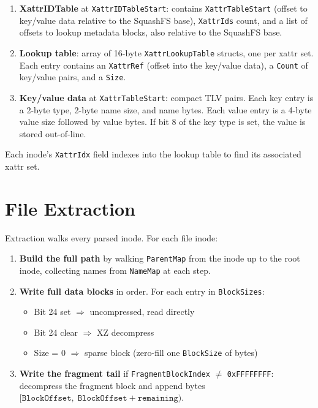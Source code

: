 \documentclass[11pt,a4paper]{article}
\begin{document}
\begin{enumerate}
    \item \textbf{XattrIDTable} at \texttt{XattrIDTableStart}: contains
      \texttt{XattrTableStart} (offset to key/value data relative to the
      SquashFS base), \texttt{XattrIds} count, and a list of offsets to
      lookup metadata blocks, also relative to the SquashFS base.

    \item \textbf{Lookup table}: array of 16-byte
          \texttt{XattrLookupTable} structs, one per xattr set.
          Each entry contains an \texttt{XattrRef} (offset into the
          key/value data), a \texttt{Count} of key/value pairs, and a
          \texttt{Size}.

    \item \textbf{Key/value data} at \texttt{XattrTableStart}: compact
          TLV pairs. Each key entry is a 2-byte type, 2-byte name size,
          and name bytes. Each value entry is a 4-byte value size followed
          by value bytes. If bit 8 of the key type is set, the value is
          stored out-of-line.
\end{enumerate}

Each inode's \texttt{XattrIdx} field indexes into the lookup table to
find its associated xattr set.

\section{File Extraction}

Extraction walks every parsed inode. For each file inode:

\begin{enumerate}
    \item \textbf{Build the full path} by walking \texttt{ParentMap} from
          the inode up to the root inode, collecting names from
          \texttt{NameMap} at each step.

    \item \textbf{Write full data blocks} in order. For each entry in
          \texttt{BlockSizes}:
          \begin{itemize}
              \item Bit 24 set \(\Rightarrow\) uncompressed, read directly
              \item Bit 24 clear \(\Rightarrow\) XZ decompress
              \item Size = 0 \(\Rightarrow\) sparse block (zero-fill one
                    \texttt{BlockSize} of bytes)
          \end{itemize}

    \item \textbf{Write the fragment tail} if
          \texttt{FragmentBlockIndex} \(\neq\) \texttt{0xFFFFFFFF}:
          decompress the fragment block and append bytes
          \([\texttt{BlockOffset},\; \texttt{BlockOffset} +
          \texttt{remaining})\).
\end{enumerate}
\end{document}
